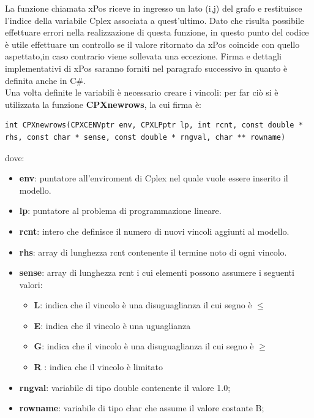 \documentclass[11pt]{article}
\begin{document}
La funzione chiamata xPos  riceve in ingresso un lato (i,j) del grafo e restituisce l'indice della variabile Cplex associata a quest'ultimo. Dato che risulta possibile effettuare errori nella realizzazione di questa funzione, in questo punto del codice è  utile effettuare un controllo se il valore ritornato da xPos coincide con quello aspettato,in caso contrario viene sollevata una eccezione. Firma e dettagli implementativi di xPos saranno forniti nel paragrafo successivo in quanto è definita anche in C\#.\\

Una volta definite le variabili è necessario creare i vincoli: per far ciò si è utilizzata la funzione \textbf{CPXnewrows}, la cui firma è:

\begin{lstlisting}
int CPXnewrows(CPXCENVptr env, CPXLPptr lp, int rcnt, const double * rhs, const char * sense, const double * rngval, char ** rowname)
\end{lstlisting}

dove:

\begin{itemize}
\item \textbf{env}: puntatore all'enviroment di Cplex nel quale vuole essere inserito il modello.
\item \textbf{lp}: puntatore al problema di programmazione lineare.
\item \textbf{rcnt}: intero che definisce il numero di nuovi vincoli aggiunti al modello.
\item \textbf{rhs}: array di lunghezza rcnt contenente il termine noto di ogni vincolo.
\item \textbf{sense}: array di lunghezza rcnt i cui elementi possono assumere i seguenti valori:

\begin{itemize}
\item \textbf{L}: indica che il vincolo è una disuguaglianza il cui segno è  $\leq$
\item \textbf{E}: indica che il vincolo è una uguaglianza
\item \textbf{G}: indica che il vincolo è una disuguaglianza il cui segno è $\geq$
\item \textbf{R} : indica che il vincolo è limitato 
\end{itemize}

\item \textbf{rngval}: variabile di tipo double contenente il valore 1.0;
\item \textbf{rowname}: variabile di tipo char che assume il valore costante B;
\end{itemize}
\end{document}
